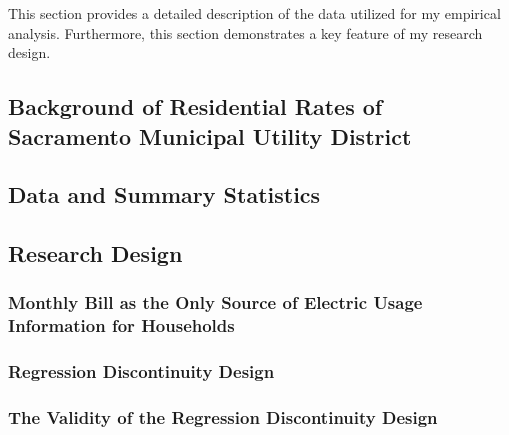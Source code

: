 This section provides a detailed description of the data utilized for my empirical analysis. Furthermore, this section demonstrates a key feature of my research design.


\subsection{Background of Residential Rates of Sacramento Municipal Utility District}
\label{C1-Sub-section:Background-of-Residential-Rates-of-SMUD}




\subsection{Data and Summary Statistics}
\label{C1-Sub-section:Data-and-Summary-Statistics}




\subsection{Research Design}
\label{C1-Sub-Section:Research-Design}

\subsubsection{Monthly Bill as the Only Source of Electric Usage Information for Households}
\label{C1-Sub-Sub-section:Monthly-Bill-as-the-Only-Source-of-Electric-Usage-Information-for-Households}


\subsubsection{Regression Discontinuity Design}
\label{C1-Sub-Sub-Section:Regression-Discontinuity-Design}


\subsubsection{The Validity of the Regression Discontinuity Design}
\label{C1-Sub-Sub-Section:The-Validity-of-the-Regression-Discontinuity-Design}

